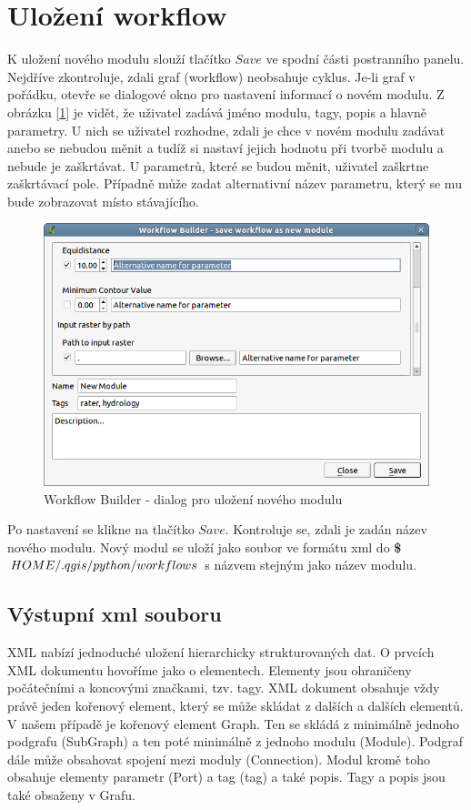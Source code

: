 \newpage
\section{Uložení workflow}
\nocite{demel:book}

K uložení nového modulu slouží tlačítko $Save$ ve spodní části
postranního panelu. Nejdříve zkontroluje, zdali graf (workflow)
neobsahuje cyklus. Je-li graf v pořádku, otevře se dialogové okno pro
nastavení informací o novém modulu. Z obrázku
[\figurename \ref{wf:saveDialog}] je vidět, že uživatel zadává jméno
modulu, tagy, popis a hlavně parametry. U nich se uživatel rozhodne,
zdali je chce v novém modulu zadávat anebo se nebudou měnit a tudíž si
nastaví jejich hodnotu při tvorbě modulu a nebude je zaškrtávat. U
parametrů, které se budou měnit, uživatel zaškrtne zaškrtávací
pole. Případně může zadat alternativní název parametru, který se mu
bude zobrazovat místo stávajícího.

\begin{figure}[h]
	\centering
	\includegraphics[scale=0.6]{pictures/wf/wf_saveDialog}
	\caption{Workflow Builder - dialog pro uložení nového modulu}
  	\label{wf:saveDialog}
\end{figure}

Po nastavení se klikne na tlačítko $Save$. Kontroluje se, zdali je
zadán název nového modulu. Nový modul se uloží jako soubor ve formátu
xml do \textbf{\$$HOME/.qgis/python/\-workflows$} s názvem stejným jako
název modulu.

\subsection{Výstupní xml souboru}
XML nabízí jednoduché uložení hierarchicky strukturovaných dat. O
prvcích XML dokumentu hovoříme jako o elementech. Elementy jsou
ohraničeny počátečními a koncovými značkami, tzv. tagy. XML dokument
obsahuje vždy právě jeden kořenový element, který se může skládat z
dalších a dalších elementů. V našem případě je kořenový element
Graph. Ten se skládá z minimálně jednoho podgrafu (SubGraph) a ten
poté minimálně z jednoho modulu (Module). Podgraf dále může obsahovat
spojení mezi moduly (Connection). Modul kromě toho obsahuje elementy
parametr (Port) a tag (tag) a také popis.  Tagy a popis jsou také
obsaženy v Grafu. \\

